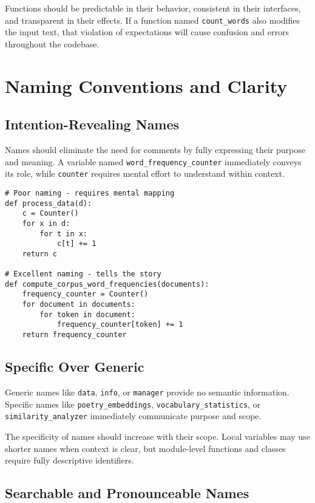 \documentclass[11pt,a4paper]{article}
\begin{document}
Functions should be predictable in their behavior, consistent in their interfaces, and transparent in their effects. If a function named \texttt{count\_words} also modifies the input text, that violation of expectations will cause confusion and errors throughout the codebase.

\section{Naming Conventions and Clarity}

\subsection{Intention-Revealing Names}

Names should eliminate the need for comments by fully expressing their purpose and meaning. A variable named \texttt{word\_frequency\_counter} immediately conveys its role, while \texttt{counter} requires mental effort to understand within context.

\begin{lstlisting}[caption=Intention-revealing naming examples]
# Poor naming - requires mental mapping
def process_data(d):
    c = Counter()
    for x in d:
        for t in x:
            c[t] += 1
    return c

# Excellent naming - tells the story
def compute_corpus_word_frequencies(documents):
    frequency_counter = Counter()
    for document in documents:
        for token in document:
            frequency_counter[token] += 1
    return frequency_counter
\end{lstlisting}

\subsection{Specific Over Generic}

Generic names like \texttt{data}, \texttt{info}, or \texttt{manager} provide no semantic information. Specific names like \texttt{poetry\_embeddings}, \texttt{vocabulary\_statistics}, or \texttt{similarity\_analyzer} immediately communicate purpose and scope.

The specificity of names should increase with their scope. Local variables may use shorter names when context is clear, but module-level functions and classes require fully descriptive identifiers.

\subsection{Searchable and Pronounceable Names}
\end{document}
